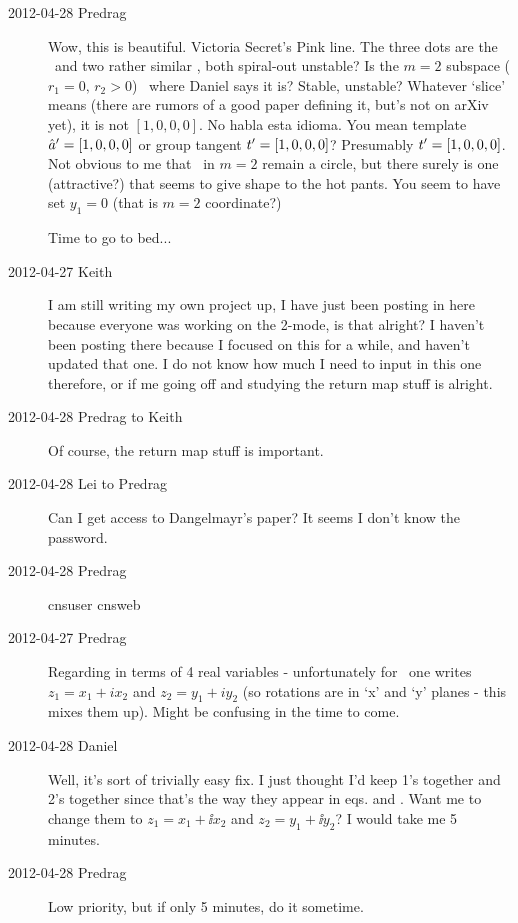 \begin{description}
\item[2012-04-28 Predrag] Wow, this is beautiful. Victoria Secret's Pink
line. The three dots are the \eqv\ and two rather similar \reqva, both
spiral-out unstable? Is the $m=2$ subspace ($r_1 = 0,\, r_2 > 0$) \reqv\
where Daniel says it is? Stable, unstable? Whatever `slice' means (there
are rumors of a good paper defining it, but's not on arXiv yet), it is
not $[1, 0, 0, 0]$. No habla esta idioma. You mean template $\hat{a}' =
[1, 0, 0, 0]$ or group tangent $t'_{} = [1, 0, 0, 0]$? Presumably
$t'_{} = [1, 0, 0, 0]$. Not obvious to me that \reqv\ in $m=2$
remain a circle, but there surely is one (attractive?) that seems to give
shape to the hot pants. You seem to have set $y_1=0$ (that is $m=2$
coordinate?)

Time to go to bed...

\item[2012-04-27 Keith]  I am still writing my own project up, I have
just been posting in here because everyone was working on the 2-mode, is
that alright?  I haven't been posting there because I focused on this for
a while, and haven't updated that one.  I do not know how much I need to
input in this one therefore, or if me going off and studying the return
map stuff is alright.

\item[2012-04-28 Predrag to Keith] Of course, the return
map stuff is important.

\item[2012-04-28 Lei to Predrag] Can I get access to Dangelmayr's paper?
It seems I don't know the password.

\item[2012-04-28 Predrag] cnsuser cnsweb

\item[2012-04-27 Predrag] Regarding  in terms of 4 real
variables \refeq{2mode4D}- unfortunately for \cLe\ one writes $z_1 = x_1
+ i x_2$ and $z_2 = y_1 + i y_2$ (so rotations are in `x' and `y' planes
- this mixes them up). Might be confusing in the time to come.

\item[2012-04-28 Daniel] Well, it's sort of trivially easy fix. I just
thought I'd keep 1's together and 2's together since that's the way they
appear in eqs. \refeq{eq:AGpolar} and \refeq{eq:DangSO2}. Want me to
change them to $z_1 = x_1 + \ii x_2$ and $z_2 = y_1 + \ii y_2$? I would
take me 5 minutes.

\item[2012-04-28 Predrag] Low priority, but if only 5 minutes, do it sometime.


\end{description}
